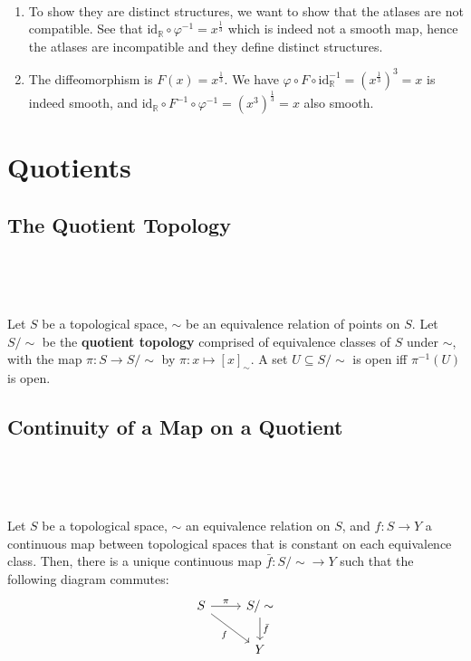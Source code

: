 \documentclass{article}
\begin{document}
\begin{customproof}
  \

  \begin{enumerate}
    \item To show they are distinct structures, we want to show that the atlases are not compatible. See that $\text{id}_\mathbb{R} \circ \varphi ^{-1} = x^\frac{1}{3}$ which is indeed not a smooth map, hence the atlases are incompatible and they define distinct structures.
    \item The diffeomorphism is $F(x) = x^\frac{1}{3}$. We have $\varphi \circ F\circ \text{id}_ \mathbb{R} ^{-1} = (x^\frac{1}{3})^3= x$ is indeed smooth, and $\text{id}_ \mathbb{R} \circ F ^{-1} \circ \varphi ^{-1} = (x^3)^\frac{1}{3} = x$ also smooth.
  \end{enumerate}
\end{customproof}

\section{Quotients}

\subsection{The Quotient Topology}
\

\begin{definition}
  \

  Let $S$ be a topological space, $\sim$ be an equivalence relation of points on $S$. Let $S/\sim$ be the \textbf{quotient topology} comprised of equivalence classes of $S$ under $\sim$, with the map $\pi: S \to S/\sim$ by $\pi: x \mapsto [x]_\sim$. A set $U \subseteq S/\sim$ is open iff $\pi ^{-1}(U)$ is open.
\end{definition}

\subsection{Continuity of a Map on a Quotient}
\

\begin{proposition}
  \

  Let $S$ be a topological space, $\sim$ an equivalence relation on $S$, and $f: S \to Y$ a continuous map between topological spaces that is constant on each equivalence class. Then, there is a unique continuous map $\bar{f}: S/\sim \to Y$ such that the following diagram commutes: \[
    \begin{tikzcd}
      S & S/\sim\\
      & Y
      \arrow[from=1-1, to=1-2, "\pi"]
      \arrow[from=1-1, to=2-2, "f"']
      \arrow[from=1-2, to=2-2, "\bar{f}"]
  \end{tikzcd}\]
\end{proposition}
\end{document}
